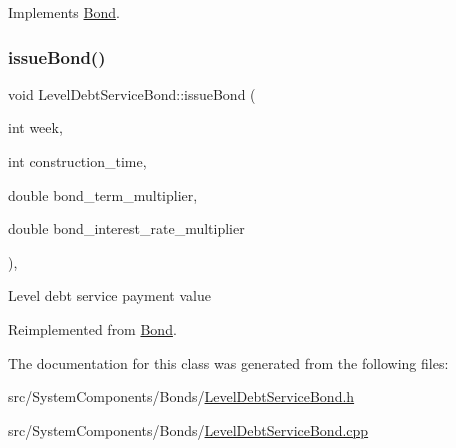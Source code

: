 Implements \mbox{\hyperlink{classBond_a5997278813deb16aa5d01bbca8ecc7b2}{Bond}}.

\mbox{\label{classLevelDebtServiceBond_a51a54a1a25be105b168bf86489aee417}} 
\subsubsection{\texorpdfstring{issue\+Bond()}{issueBond()}}
{\footnotesize\ttfamily void Level\+Debt\+Service\+Bond\+::issue\+Bond (\begin{DoxyParamCaption}\item[{int}]{week,  }\item[{int}]{construction\+\_\+time,  }\item[{double}]{bond\+\_\+term\+\_\+multiplier,  }\item[{double}]{bond\+\_\+interest\+\_\+rate\+\_\+multiplier }\end{DoxyParamCaption})\hspace{0.3cm}{\ttfamily [override]}, {\ttfamily [virtual]}}

Level debt service payment value 

Reimplemented from \mbox{\hyperlink{classBond_a377db8c18b83c4666e46686bc26adef1}{Bond}}.



The documentation for this class was generated from the following files\+:\begin{DoxyCompactItemize}
\item 
src/\+System\+Components/\+Bonds/\mbox{\hyperlink{LevelDebtServiceBond_8h}{Level\+Debt\+Service\+Bond.\+h}}\item 
src/\+System\+Components/\+Bonds/\mbox{\hyperlink{LevelDebtServiceBond_8cpp}{Level\+Debt\+Service\+Bond.\+cpp}}\end{DoxyCompactItemize}
